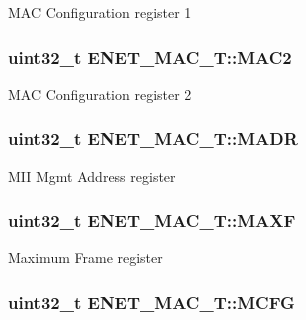 M\-A\-C Configuration register 1 \hypertarget{structENET__MAC__T_a925a92dbe2a48105e6497378a8cdfcac}{
\subsubsection[{M\-A\-C2}]{ uint32\-\_\-t E\-N\-E\-T\-\_\-\-M\-A\-C\-\_\-\-T\-::\-M\-A\-C2}}\label{structENET__MAC__T_a925a92dbe2a48105e6497378a8cdfcac}
M\-A\-C Configuration register 2 \hypertarget{structENET__MAC__T_afc17c49a8ba00a4a4db6dc0b87d949b7}{
\subsubsection[{M\-A\-D\-R}]{ uint32\-\_\-t E\-N\-E\-T\-\_\-\-M\-A\-C\-\_\-\-T\-::\-M\-A\-D\-R}}\label{structENET__MAC__T_afc17c49a8ba00a4a4db6dc0b87d949b7}
M\-I\-I Mgmt Address register \hypertarget{structENET__MAC__T_a5e6d2bc05984b815f245d2ebd3c067a3}{
\subsubsection[{M\-A\-X\-F}]{ uint32\-\_\-t E\-N\-E\-T\-\_\-\-M\-A\-C\-\_\-\-T\-::\-M\-A\-X\-F}}\label{structENET__MAC__T_a5e6d2bc05984b815f245d2ebd3c067a3}
Maximum Frame register \hypertarget{structENET__MAC__T_a1e733caa47928bbd88205c10549db3b6}{
\subsubsection[{M\-C\-F\-G}]{ uint32\-\_\-t E\-N\-E\-T\-\_\-\-M\-A\-C\-\_\-\-T\-::\-M\-C\-F\-G}}\label{structENET__MAC__T_a1e733caa47928bbd88205c10549db3b6}
